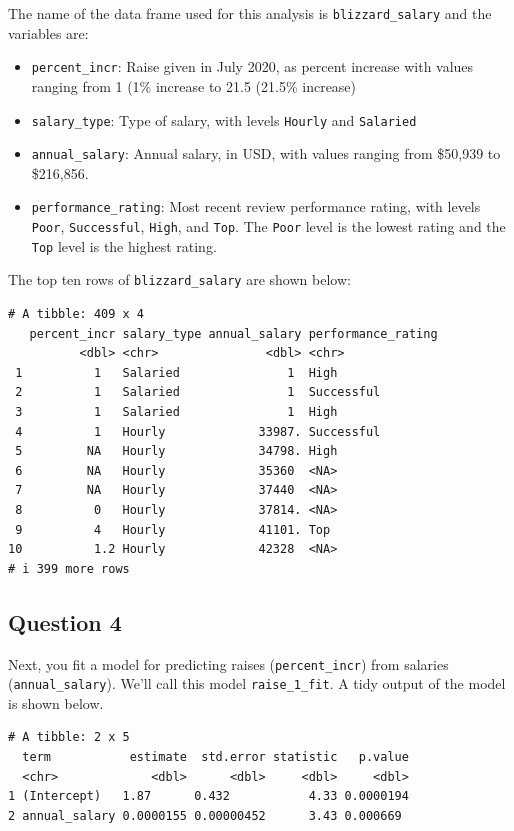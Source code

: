 \documentclass[
  letterpaper,
  DIV=11,
  numbers=noendperiod]{scrartcl}
\begin{document}
The name of the data frame used for this analysis is
\texttt{blizzard\_salary} and the variables are:

\begin{itemize}
\item
  \texttt{percent\_incr}: Raise given in July 2020, as percent increase
  with values ranging from 1 (1\% increase to 21.5 (21.5\% increase)
\item
  \texttt{salary\_type}: Type of salary, with levels \texttt{Hourly} and
  \texttt{Salaried}
\item
  \texttt{annual\_salary}: Annual salary, in USD, with values ranging
  from \$50,939 to \$216,856.
\item
  \texttt{performance\_rating}: Most recent review performance rating,
  with levels \texttt{Poor}, \texttt{Successful}, \texttt{High}, and
  \texttt{Top}. The \texttt{Poor} level is the lowest rating and the
  \texttt{Top} level is the highest rating.
\end{itemize}

The top ten rows of \texttt{blizzard\_salary} are shown below:

\begin{verbatim}
# A tibble: 409 x 4
   percent_incr salary_type annual_salary performance_rating
          <dbl> <chr>               <dbl> <chr>             
 1          1   Salaried               1  High              
 2          1   Salaried               1  Successful        
 3          1   Salaried               1  High              
 4          1   Hourly             33987. Successful        
 5         NA   Hourly             34798. High              
 6         NA   Hourly             35360  <NA>              
 7         NA   Hourly             37440  <NA>              
 8          0   Hourly             37814. <NA>              
 9          4   Hourly             41101. Top               
10          1.2 Hourly             42328  <NA>              
# i 399 more rows
\end{verbatim}

\subsection{Question 4}\label{question-4}

Next, you fit a model for predicting raises (\texttt{percent\_incr})
from salaries (\texttt{annual\_salary}). We'll call this model
\texttt{raise\_1\_fit}. A tidy output of the model is shown below.

\begin{verbatim}
# A tibble: 2 x 5
  term           estimate  std.error statistic   p.value
  <chr>             <dbl>      <dbl>     <dbl>     <dbl>
1 (Intercept)   1.87      0.432           4.33 0.0000194
2 annual_salary 0.0000155 0.00000452      3.43 0.000669 
\end{verbatim}
\end{document}
